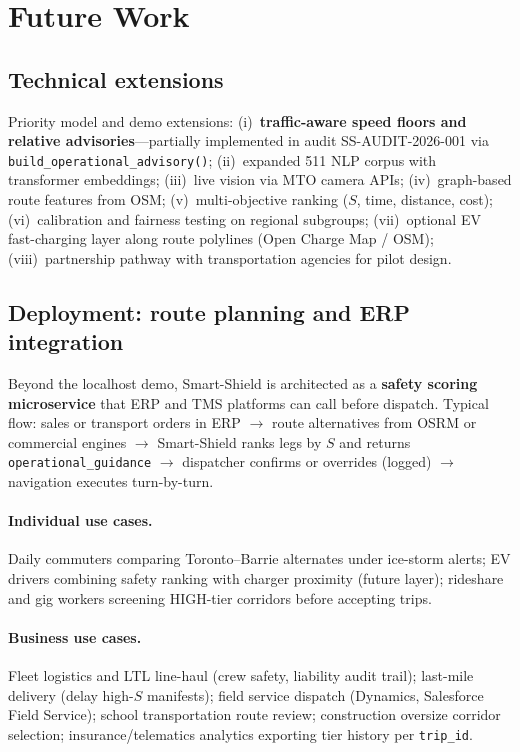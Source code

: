 \documentclass[11pt,a4paper]{article}
\begin{document}
\section{Future Work}
\label{sec:future}

\subsection{Technical extensions}
Priority model and demo extensions: (i)~\textbf{traffic-aware speed floors and relative advisories}---partially implemented in audit SS-AUDIT-2026-001 via \texttt{build\_operational\_advisory()}; (ii)~expanded 511 NLP corpus with transformer embeddings; (iii)~live vision via MTO camera APIs; (iv)~graph-based route features from OSM; (v)~multi-objective ranking ($S$, time, distance, cost); (vi)~calibration and fairness testing on regional subgroups; (vii)~optional EV fast-charging layer along route polylines (Open Charge Map / OSM); (viii)~partnership pathway with transportation agencies for pilot design.

\subsection{Deployment: route planning and ERP integration}
Beyond the localhost demo, Smart-Shield is architected as a \textbf{safety scoring microservice} that ERP and TMS platforms can call before dispatch. Typical flow: sales or transport orders in ERP $\rightarrow$ route alternatives from OSRM or commercial engines $\rightarrow$ Smart-Shield ranks legs by $S$ and returns \texttt{operational\_guidance} $\rightarrow$ dispatcher confirms or overrides (logged) $\rightarrow$ navigation executes turn-by-turn.

\paragraph{Individual use cases.}
Daily commuters comparing Toronto--Barrie alternates under ice-storm alerts; EV drivers combining safety ranking with charger proximity (future layer); rideshare and gig workers screening HIGH-tier corridors before accepting trips.

\paragraph{Business use cases.}
Fleet logistics and LTL line-haul (crew safety, liability audit trail); last-mile delivery (delay high-$S$ manifests); field service dispatch (Dynamics, Salesforce Field Service); school transportation route review; construction oversize corridor selection; insurance/telematics analytics exporting tier history per \texttt{trip\_id}.
\end{document}
